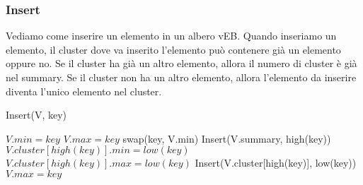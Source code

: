 \documentclass{article}
\begin{document}
        
        \newpage
        \subsubsection{Insert}
            Vediamo come inserire un elemento in un albero vEB. Quando inseriamo un elemento, il cluster dove va inserito l'elemento può contenere già un elemento oppure no. Se il cluster ha già un altro elemento, allora il numero di cluster è già nel summary. Se il cluster non ha un altro elemento, allora l'elemento da inserire diventa l'unico elemento nel cluster.
            
            \begin{algorithm}
                \caption{Insert(V, key)}
                \begin{algorithmic}
                        \STATE $V.min = key$
                        \STATE $V.max = key$
                        \STATE swap(key, V.min)
                                \STATE Insert(V.summary, high(key))
                                \STATE $V.cluster[high(key)].min = low(key)$
                                \STATE $V.cluster[high(key)].max = low(key)$
                            \ELSE
                                Insert(V.cluster[high(key)], low(key))
                            \ENDIF
                        \ENDIF
                            $V.max = key$
                        \ENDIF
                    \ENDIF
                \end{algorithmic}
            \end{algorithm}
            
\end{document}

